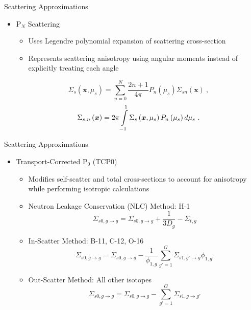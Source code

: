 
\begin{frame}[t]{Scattering Approximations}
    
\begin{itemize}
    \item P$_N$ Scattering
    \begin{itemize}
      \item Uses Legendre polynomial expansion of scattering cross-section
      \item Represents scattering anisotropy using angular moments instead of 
      explicitly treating each angle
    \end{itemize}
        \begin{equation*}
        \Sigma_s\left(\bm x,\mu_s\right) = \sum_{n=0}^N \frac{2n+1}{4\pi} P_n\left(\mu_s\right) \Sigma_{sn}\left(\bm x\right)\ ,
        \end{equation*}
        \begin{equation*}
        \Sigma_{s,n}\left(\bm x\right) = 2\pi\intop_{-1}^1 \Sigma_s\left(\bm x,\mu_s\right) P_n\left(\mu_s\right) d\mu_s\ .
        \end{equation*}
      \end{itemize}
  
\end{frame}


\begin{frame}[t]{Scattering Approximations}
  
  \begin{itemize}
    \item Transport-Corrected P$_0$ (TCP0)
    \begin{itemize}
      \item Modifies self-scatter and total cross-sections to account for 
      anisotropy while performing isotropic calculations
      \item Neutron Leakage Conservation (NLC) Method: H-1
      \begin{equation*}
      \Sigma_{s0,g\rightarrow g} = \Sigma_{s0,g\rightarrow g} + \frac{1}{3D_g} 
      - \Sigma_{t,g}
      \end{equation*}
      \item In-Scatter Method: B-11, C-12, O-16
      \begin{equation*}
      \Sigma_{s0,g\rightarrow g} = \Sigma_{s0,g\rightarrow g} - 
      \frac{1}{\phi_{1,g}}\sum_{g'=1}^G \Sigma_{s1,g'\rightarrow g}\phi_{1,g'}
      \end{equation*}
      \item Out-Scatter Method: All other isotopes
      \begin{equation*}
      \Sigma_{s0,g\rightarrow g} = \Sigma_{s0,g\rightarrow g} - \sum_{g'=1}^G 
      \Sigma_{s1,g\rightarrow g'}
      \end{equation*}
    \end{itemize}
\end{itemize}

\end{frame}